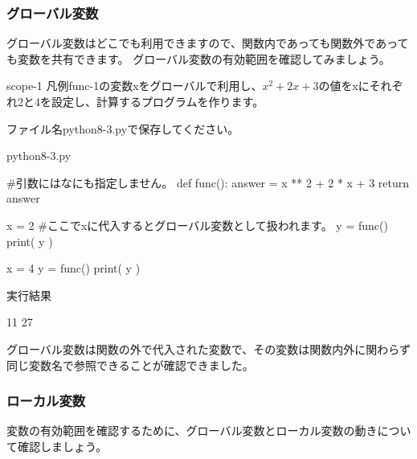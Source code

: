 \documentclass[11pt,a4paper,dvipdfmx,titlepage]{jsreport}
\begin{document}
\subsubsection{グローバル変数}
グローバル変数はどこでも利用できますので、関数内であっても関数外であっても変数を共有できます。
グローバル変数の有効範囲を確認してみましょう。

\begin{pabox}{scope-1}
凡例func-1の変数xをグローバルで利用し、$x^2 + 2 x + 3$の値をxにそれぞれ2と4を設定し、計算するプログラムを作ります。

ファイル名python8-3.pyで保存してください。
\begin{codebox}{python8-3.py}
\begin{listing}{1}
#引数にはなにも指定しません。
def func():
    answer = x ** 2 + 2 * x + 3
    return answer

x = 2
#ここでxに代入するとグローバル変数として扱われます。
y = func()
print( y )

x = 4
y = func()
print( y )
\end{listing}
実行結果
\begin{listing}{1}
11
27
\end{listing}
\end{codebox}
\end{pabox}
グローバル変数は関数の外で代入された変数で、その変数は関数内外に関わらず同じ変数名で参照できることが確認できました。

\newpage
\subsubsection{ローカル変数}
変数の有効範囲を確認するために、グローバル変数とローカル変数の動きについて確認しましょう。
\end{document}
